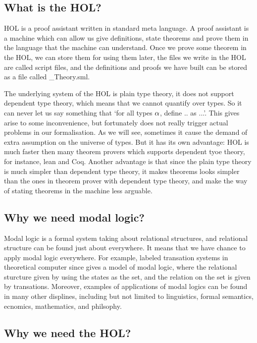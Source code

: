 \documentclass[letterpaper]{article}
\renewcommand{\HOLinline}[1]{\ensuremath{#1}}
\begin{document}
\subsection{What is the HOL?}

HOL is a proof assistant written in standard meta language. A proof assistant is a machine which can allow us give definitions, state theorems and prove them in the language that the machine can understand. Once we prove some theorem in the HOL, we can store them for using them later, the files we write in the HOL are called script files, and the definitions and proofs we have built can be stored as a file called \_Theory.sml.


The underlying system of the HOL is plain type theory, it does not support dependent type theory, which means that  we cannot quantify over types. So it can never let us say something that `for all types \HOLinline{\HOLFreeVar{\ensuremath{\alpha}}}, define .. as ...'. This gives arise to some inconvenience,  but fortunately does not really trigger actual problems in our formalisation. As we will see, sometimes it cause the demand of extra assumption on the universe of types. But it has its own advantage: HOL is much faster then many theorem provers which supports dependent tyoe theory, for instance, lean and Coq. Another advantage is that since the plain type theory is much simpler than dependent type theory, it makes theorems looks simpler than the ones in theorem prover with dependent type theory, and make the way of stating theorems in the machine less arguable.


\subsection{Why we need modal logic?}

Modal logic is a formal system taking about relational structures, and relational structure can be found just about everywhere. It means that we have chance to apply modal logic everywhere. For example, labeled transation systems in theoretical computer since gives a model of modal logic, where the relational sturcture given by using the states as the set, and the relation on the set is given by transations. Moreover, examples of applications of modal logics can be found in many other displines, including but not limited to linguistics, formal semantics, ecnomics, mathematics, and philsophy. 

\subsection{Why we need the HOL?}
\end{document}
